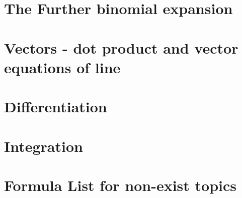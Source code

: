\documentclass[a4paper]{article}
\begin{document}
\section{The Further binomial expansion}

\section{Vectors - dot product and vector equations of line}

\section{Differentiation}

\section{Integration}

\section{Formula List for non-exist topics}

\begin{defi}

\end{defi}
\begin{defi}

\end{defi}
\end{document}
